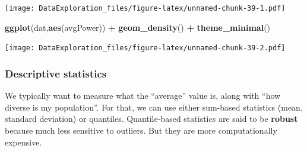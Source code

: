 \documentclass[
]{book}
\newenvironment{Shaded}{\begin{snugshade}}{\end{snugshade}}
\newcommand{\KeywordTok}[1]{\textcolor[rgb]{0.13,0.29,0.53}{\textbf{#1}}}
\newcommand{\NormalTok}[1]{#1}
\newcommand{\OperatorTok}[1]{\textcolor[rgb]{0.81,0.36,0.00}{\textbf{#1}}}
\newcommand{\StringTok}[1]{\textcolor[rgb]{0.31,0.60,0.02}{#1}}
\begin{document}
\texttt{[image: DataExploration\_files/figure-latex/unnamed-chunk-39-1.pdf]}

\begin{Shaded}
\begin{Highlighting}[]
\KeywordTok{ggplot}\NormalTok{(dat,}\KeywordTok{aes}\NormalTok{(avgPower)) }\OperatorTok{+}\StringTok{ }\KeywordTok{geom_density}\NormalTok{() }\OperatorTok{+}\StringTok{ }\KeywordTok{theme_minimal}\NormalTok{()}
\end{Highlighting}
\end{Shaded}

\texttt{[image: DataExploration\_files/figure-latex/unnamed-chunk-39-2.pdf]}

\hypertarget{descriptive-statistics}{%
\subsubsection{Descriptive statistics}\label{descriptive-statistics}}

We typically want to measure what the ``average'' value is, along with ``how diverse is my population''. For that, we can use either sum-based statistics (mean, standard deviation) or quantiles.
Quantile-based statistics are said to be \textbf{robust} because much less sensitive to outliers. But they are more computationally expensive.
\end{document}
